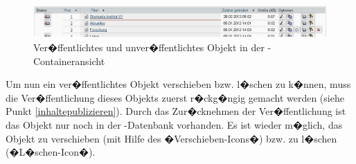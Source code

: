 \begin{figure}[!ht]
	\centering
		\includegraphics[width=\textwidth]{./images/publishednotpublished.png}
	\caption{Ver�ffentlichtes und unver�ffentlichtes Objekt in der -Containeransicht}
	\label{fig:publishednotpublished}
\end{figure}

Um nun ein ver�ffentlichtes Objekt verschieben bzw. l�schen zu k�nnen, muss die
Ver�ffentlichung dieses Objekts zuerst r�ckg�ngig gemacht werden (siehe Punkt \ref{inhaltepublizieren}). Durch das Zur�cknehmen der Ver�ffentlichung ist das Objekt nur noch in der
-Datenbank vorhanden. Es ist wieder m�glich, das Objekt zu verschieben (mit
Hilfe des �Verschieben-Icons�) bzw. zu l�schen (�L�schen-Icon�).

%
%
%
%
%
%
%
